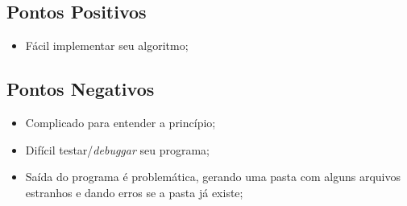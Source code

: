 \subsection{Pontos Positivos}
\begin{itemize}
  \item Fácil implementar seu algoritmo;
\end{itemize}

\subsection{Pontos Negativos}
\begin{itemize}
  \item Complicado para entender a princípio;
  \item Difícil testar/\textit{debuggar} seu programa;
  \item Saída do programa é problemática, gerando uma pasta com alguns arquivos estranhos e dando
        erros se a pasta já existe;
\end{itemize}


